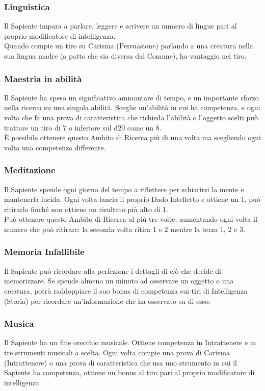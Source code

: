 \subsubsection{Linguistica}
Il Sapiente impara a parlare, leggere e scrivere un numero di lingue pari al proprio modificatore di intelligenza.\\
Quando compie un tiro su Carisma (Persuasione) parlando a una creatura nella sua lingua madre (a patto che sia diversa dal Comune), ha vantaggio nel tiro.

\subsubsection{Maestria in abilità}
Il Sapiente ha speso un significativo ammontare di tempo, e un importante sforzo nella ricerca su una singola abilità. Sceglie un'abilità in cui ha competenza, e ogni volta che fa una prova di caratteristica che richieda l'abilità o l'oggetto scelti può trattare un tiro di 7 o inferiore sul d20 come un 8.\\
È possibile ottenere questo Ambito di Ricerca più di una volta ma scegliendo ogni volta una competenza differente.

\subsubsection{Meditazione}
Il Sapiente spende ogni giorno del tempo a riflettere per schiarirsi la mente e mantenerla lucida. Ogni volta lancia il proprio Dado Intelletto e ottiene un 1, può ritirarlo finché non ottiene un risultato più alto di 1.\\
Può ottenere questo Ambito di Ricerca al più tre volte, aumentando ogni volta il numero che può ritirare: la seconda volta ritira 1 e 2 mentre la terza 1, 2 e 3.

\subsubsection{Memoria Infallibile}
Il Sapiente può ricordare alla perfezione i dettagli di ciò che decide di memorizzare. Se spende almeno un minuto ad osservare un oggetto o una creatura, potrà raddoppiare il suo bonus di competenza sui tiri di Intelligenza (Storia) per ricordare un'informazione che ha osservato su di esso.

\subsubsection{Musica}
Il Sapiente ha un fine orecchio musicale. Ottiene competenza in Intrattenere e in tre strumenti musicali a scelta. Ogni volta compie una prova di Carisma (Intrattenere) o una prova di caratteristica che usa uno strumento in cui il Sapiente ha competenza, ottiene un bonus al tiro pari al proprio modificatore di intelligenza.

